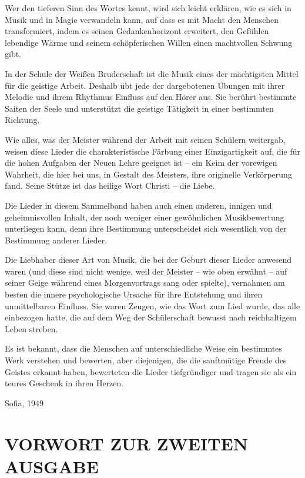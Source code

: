 \documentclass[11pt,a5paper,twoside]{article}
\begin{document}
Wer den tieferen Sinn des Wortes kennt, wird sich leicht erklären, wie es sich in Musik und in Magie verwandeln kann, auf dass es mit Macht den Menschen transformiert, indem es seinen Gedankenhorizont erweitert, den Gefühlen lebendige Wärme und seinem schöpferischen Willen einen machtvollen Schwung gibt.

In der Schule der Weißen Bruderschaft ist die Musik eines der mächtigsten Mittel für die geistige Arbeit. Deshalb übt jede der dargebotenen Übungen mit ihrer Melodie und ihrem Rhythmus Einfluss auf den Hörer aus. Sie berührt bestimmte Saiten der Seele und unterstützt die geistige Tätigkeit in einer bestimmten Richtung.

Wie alles, was der Meister während der Arbeit mit seinen Schülern weitergab, weisen diese Lieder die charakteristische Färbung einer Einzigartigkeit auf, die für die hohen Aufgaben der Neuen Lehre geeignet ist – ein Keim der vorewigen Wahrheit, die hier bei uns, in Gestalt des Meisters, ihre originelle Verkörperung fand. Seine Stütze ist das heilige Wort Christi –  die Liebe.

Die Lieder in diesem Sammelband haben auch einen anderen, innigen und geheimnisvollen Inhalt, der noch weniger einer gewöhnlichen Musikbewertung unterliegen kann, denn ihre Bestimmung unterscheidet sich wesentlich von der Bestimmung anderer Lieder.

Die Liebhaber dieser Art von Musik, die bei der Geburt dieser Lieder anwesend waren (und diese sind nicht wenige, weil der Meister – wie oben erwähnt – auf seiner Geige während eines Morgenvortrags sang oder spielte), vernahmen am besten die innere psychologische Ursache für ihre Entstehung und ihren unmittelbaren Einfluss. Sie waren Zeugen, wie das Wort zum Lied wurde, das alle einbezogen hatte, die auf dem Weg der Schülerschaft bewusst nach reichhaltigem Leben streben.

Es ist bekannt, dass die Menschen auf unterschiedliche Weise ein bestimmtes Werk verstehen und bewerten, aber diejenigen, die die sanftmütige Freude des Geistes erkannt haben, bewerteten die Lieder tiefgründiger und tragen sie als ein teures Geschenk in ihren Herzen.

\begin{flushright}
	Sofia, 1949
\end{flushright}

\section[Vorwort zur zweiten Ausgabe]{VORWORT ZUR ZWEITEN AUSGABE}
\end{document}
